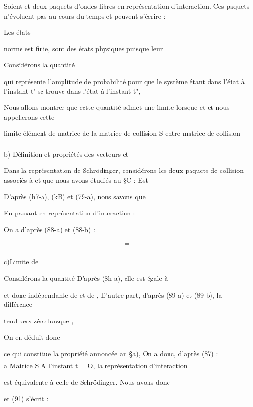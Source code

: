 Soient  et  deux paquets d'ondes libres
en représentation d'interaction. Ces paquets n'évoluent pas au
cours du temps et peuvent s'écrire :

Les états 

norme est finie,
 sont des états physiques puisque leur

Considérons la quantité

qui représente l'amplitude de probabilité pour que le système
étant dans l'état  à l'instant t' se trouve dans l'état
à l'instant t",

Nous allons montrer que cette quantité admet une
limite lorsque  et  et nous appellerons cette

limite élément de matrice de la matrice de collision S entre
 matrice de collision 

%

\subsubsection{}%
b) Définition et propriétés des vecteurs  et 

Dans la représentation de Schrödinger, considérons les deux
paquets de collision associés à  et  que nous avons
étudiés au \S C : Est

D'après (h7-a), (kB) et (79-a), nous savons que

En passant en représentation d'interaction :

On a d'après (88-a) et (88-b) :

\[
\tag{89-a}=
\]
\[
\tag{89-b}=
\]


\subsubsection{}%
c)Limite de 

Considérons la quantité
D'après (8h-a), elle est égale à

et donc indépendante de  et de ,
D'autre part, d'après (89-a) et (89-b), la différence

tend vers zéro lorsque ,

On en déduit donc :

ce qui constitue la propriété annoncée au \S a),
On a donc, d'après (87) :
\[
\tag{91}=
\]
a Matrice S
A l'instant t = O, la représentation d'interaction

est équivalente à celle de Schrödinger. Nous avons donc

et (91) s'écrit :

